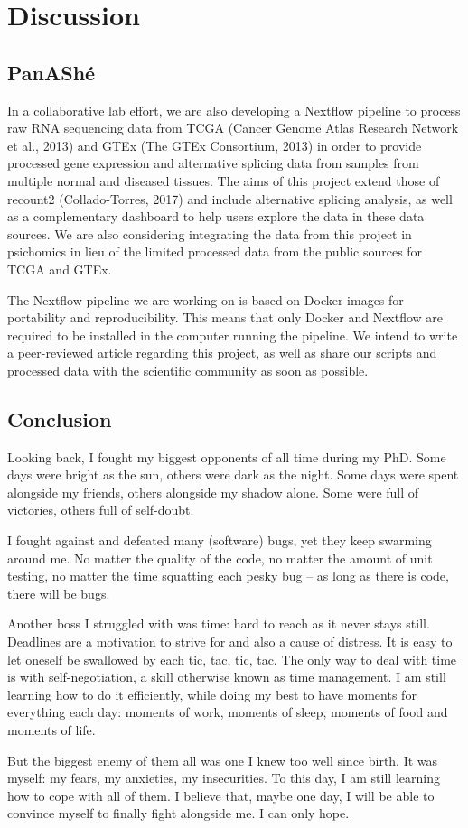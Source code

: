 \chapter{Discussion}

\section{PanAShé}

In a collaborative lab effort, we are also developing a Nextflow pipeline to process raw RNA sequencing data from TCGA (Cancer Genome Atlas Research Network et al., 2013) and GTEx (The GTEx Consortium, 2013) in order to provide processed gene expression and alternative splicing data from samples from multiple normal and diseased tissues. The aims of this project extend those of recount2 (Collado-Torres, 2017) and include alternative splicing analysis, as well as a complementary dashboard to help users explore the data in these data sources. We are also considering integrating the data from this project in psichomics in lieu of the limited processed data from the public sources for TCGA and GTEx.

The Nextflow pipeline we are working on is based on Docker images for portability and reproducibility. This means that only Docker and Nextflow are required to be installed in the computer running the pipeline. We intend to write a peer-reviewed article regarding this project, as well as share our scripts and processed data with the scientific community as soon as possible.

\section{Conclusion}

Looking back, I fought my biggest opponents of all time during my PhD. Some days were bright as the sun, others were dark as the night. Some days were spent alongside my friends, others alongside my shadow alone. Some were full of victories, others full of self-doubt.

I fought against and defeated many (software) bugs, yet they keep swarming around me. No matter the quality of the code, no matter the amount of unit testing, no matter the time squatting each pesky bug -- as long as there is code, there will be bugs.

Another boss I struggled with was time: hard to reach as it never stays still. Deadlines are a motivation to strive for and also a cause of distress. It is easy to let oneself be swallowed by each tic, tac, tic, tac. The only way to deal with time is with self-negotiation, a skill otherwise known as time management. I am still learning how to do it efficiently, while doing my best to have moments for everything each day: moments of work, moments of sleep, moments of food and moments of life.

But the biggest enemy of them all was one I knew too well since birth. It was myself: my fears, my anxieties, my insecurities. To this day, I am still learning how to cope with all of them. I believe that, maybe one day, I will be able to convince myself to finally fight alongside me. I can only hope.